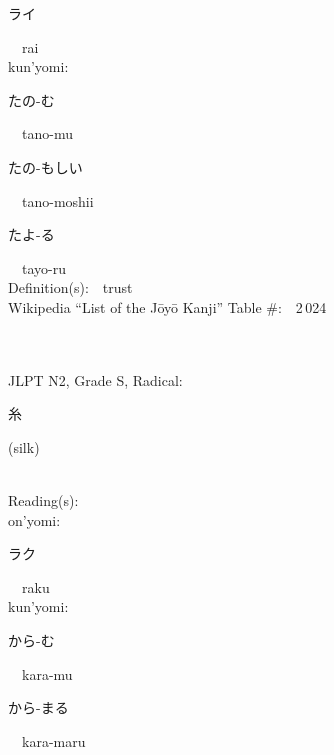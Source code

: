 \begin{multicols}{2}
{\hspace*{2em}}{\begin{CJK}{UTF8}{min} ライ \end{CJK}}\ \ rai\ \ \\
{\hspace*{1em}}kun'yomi:\ \ \\
{\hspace*{2em}}{\begin{CJK}{UTF8}{min} たの-む \end{CJK}}\ \ tano-mu\ \ \\
{\hspace*{2em}}{\begin{CJK}{UTF8}{min} たの-もしい \end{CJK}}\ \ tano-moshii\ \ \\
{\hspace*{2em}}{\begin{CJK}{UTF8}{min} たよ-る \end{CJK}}\ \ tayo-ru\ \ \\
Definition(s):\ \ trust \\
Wikipedia ``List of the J\=oy\=o Kanji'' Table \#:\ \ 2\,024 \\
\ \ \\
{\fontsize{34pt}{40pt}  }\ \ \\  %
{JLPT N2, Grade S, Radical:\ \ {\begin{CJK}{UTF8}{min} 糸 \end{CJK}} (silk) } \\
Reading(s):\ \ \\
{\hspace*{1em}}on'yomi:\ \ \\
{\hspace*{2em}}{\begin{CJK}{UTF8}{min} ラク \end{CJK}}\ \ raku\ \ \\
{\hspace*{1em}}kun'yomi:\ \ \\
{\hspace*{2em}}{\begin{CJK}{UTF8}{min} から-む \end{CJK}}\ \ kara-mu\ \ \\
{\hspace*{2em}}{\begin{CJK}{UTF8}{min} から-まる \end{CJK}}\ \ kara-maru\ \ \\

\end{multicols}

